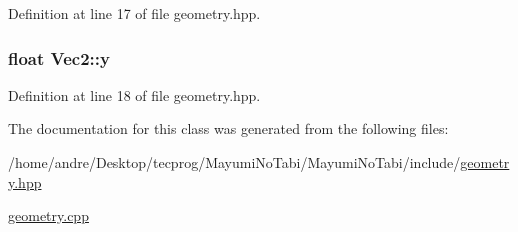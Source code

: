 Definition at line 17 of file geometry.\-hpp.

\hypertarget{class_vec2_a30543787e62f6d915543cf1dfb04c094}{
\subsubsection[{y}]{\setlength{\rightskip}{0pt plus 5cm}float Vec2\-::y}}\label{class_vec2_a30543787e62f6d915543cf1dfb04c094}


Definition at line 18 of file geometry.\-hpp.



The documentation for this class was generated from the following files\-:\begin{DoxyCompactItemize}
\item 
/home/andre/\-Desktop/tecprog/\-Mayumi\-No\-Tabi/\-Mayumi\-No\-Tabi/include/\hyperlink{geometry_8hpp}{geometry.\-hpp}\item 
\hyperlink{geometry_8cpp}{geometry.\-cpp}\end{DoxyCompactItemize}
